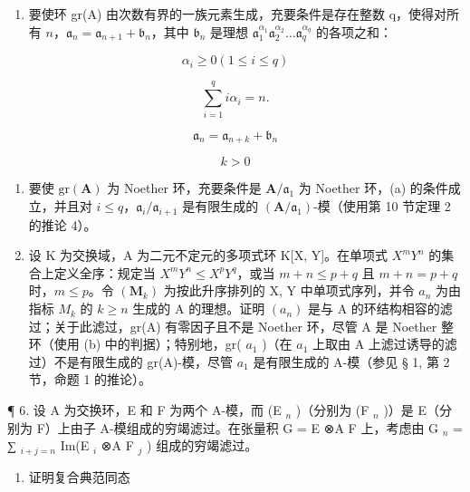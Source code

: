 \begin{enumerate}
\def\labelenumi{(\alph{enumi})}
\tightlist
\item
  要使环 gr(A) 由次数有界的一族元素生成，充要条件是存在整数 q，使得对所有 \(n\)，\(\mathfrak{a}_n = \mathfrak{a}_{n+1} + \mathfrak{b}_n\)，其中 \(\mathfrak{b}_n\) 是理想 \(\mathfrak{a}_1^{\alpha_1}\mathfrak{a}_2^{\alpha_2}\ldots\mathfrak{a}_q^{\alpha_q}\) 的各项之和：
\end{enumerate}

\[
\alpha_ {i} \geqslant 0 (1 \leqslant i \leqslant q)
\]

\[
\sum_ {i = 1} ^ {q} i \alpha_ {i} = n.
\]

\[
\mathfrak {a} _ {n} = \mathfrak {a} _ {n + k} + \mathfrak {b} _ {n}
\]

\[
k > 0
\]

\begin{enumerate}
\def\labelenumi{(\alph{enumi})}
\setcounter{enumi}{1}
\item
  要使 \(\mathrm{gr}(\mathbf{A})\) 为 Noether 环，充要条件是 \(\mathbf{A} / \mathfrak{a}_1\) 为 Noether 环，(a) 的条件成立，并且对 \(i \leqslant q\)，\(\mathfrak{a}_i / \mathfrak{a}_{i+1}\) 是有限生成的 \((\mathbf{A} / \mathfrak{a}_1)\)-模（使用第 10 节定理 2 的推论 4）。
\item
  设 K 为交换域，A 为二元不定元的多项式环 K{[}X, Y{]}。在单项式 \(X^{m}Y^{n}\) 的集合上定义全序：规定当 \(X^{m}Y^{n} \leqslant X^{p}Y^{q}\)，或当 \(m + n \leqslant p + q\) 且 \(m + n = p + q\) 时，\(m \leqslant p\)。令 \((\mathbf{M}_{k})\) 为按此升序排列的 X, Y 中单项式序列，并令 \(a_{n}\) 为由指标 \(M_{k}\) 的 \(k \geqslant n\) 生成的 A 的理想。证明 \((a_{n})\) 是与 A 的环结构相容的滤过；关于此滤过，gr(A) 有零因子且不是 Noether 环，尽管 A 是 Noether 整环（使用 (b) 中的判据）；特别地，gr( \(a_{1}\) )（在 \(a_{1}\) 上取由 A 上滤过诱导的滤过）不是有限生成的 gr(A)-模，尽管 \(a_{1}\) 是有限生成的 A-模（参见 § 1, 第 2 节，命题 1 的推论）。~
\end{enumerate}

¶ 6. 设 A 为交换环，E 和 F 为两个 A-模，而 (E \(_{n}\) )（分别为 (F \(_{n}\) )）是 E（分别为 F）上由子 A-模组成的穷竭滤过。在张量积 G = E ⊗A F 上，考虑由 G \(_{n}\) = ∑ \(_{i+j=n}\) Im(E \(_{i}\) ⊗A F \(_{j}\) ) 组成的穷竭滤过。

\begin{enumerate}
\def\labelenumi{(\alph{enumi})}
\tightlist
\item
  证明复合典范同态
\end{enumerate}

